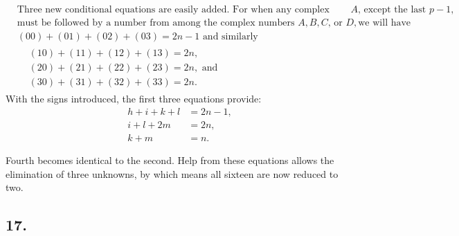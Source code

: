\documentclass[twoside,12pt, showframe]{memoir}
\begin{document}
\begin{align*}
& \text{Three new conditional equations are easily added. For when any complex number } A \text{, except the last } p-1,\\
& \text{must be followed by a number from among the complex numbers } A, B, C \text{, or } D, \text{we will have}\\
& (00)+(01)+(02)+(03)=2n-1 \text{ and similarly}\\
& \begin{aligned}
&(10)+(11)+(12)+(13)=2n, \\
&(20)+(21)+(22)+(23)=2n, \text{ and} \\
&(30)+(31)+(32)+(33)=2n.
\end{aligned}
\end{align*}
With the signs introduced, the first three equations provide:
\[
\begin{aligned}
h+i+k+l & =2n-1, \\
i+l+2m & =2n, \\
k+m & =n.
\end{aligned}
\]

Fourth becomes identical to the second. Help from these equations allows the elimination of three unknowns, by which means all sixteen are now reduced to two.
%

\subsection*{17.}
\end{document}
